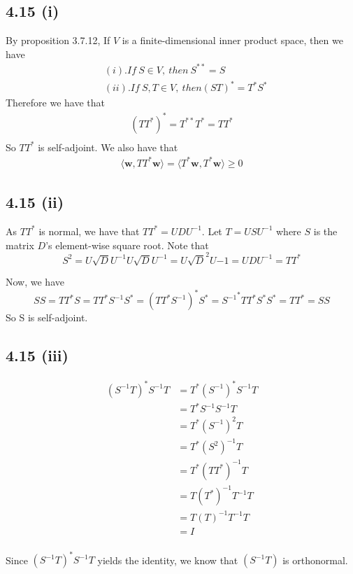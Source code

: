 \documentclass[letterpaper,12pt]{article}
\theoremstyle{definition}
\begin{document}
\subsection*{4.15 (i)}
By proposition 3.7.12, If $V$ is a finite-dimensional inner product space, then we have
\begin{align*}
&(i). If ~S \in V,~ then~ S^{**} = S\\
&(ii). If ~S,T \in V, ~then (ST)^* = T^*S^*
\end{align*}
Therefore we have that 
\begin{align*}
(TT^*)^* = T^{**}T^* = TT^* \\
\end{align*}
So $TT^*$ is self-adjoint. We also have that
\begin{align*}
\langle \mathbf{w}, TT^* \mathbf{w} \rangle = \langle T^* \mathbf{w}, T^* \mathbf{w} \rangle \geq 0
\end{align*}


\subsection*{4.15 (ii)}
As $TT^*$ is normal, we have that $TT^* = UDU^{-1}$. Let $T = USU^{-1}$ where $S$ is the matrix $D$'s element-wise square root. Note that
\[ S^2 = U\sqrt{D}U^{-1}U\sqrt{D}U^{-1} = U\sqrt{D}^2U{-1} = UDU^{-1} = TT^*\]
    
Now, we have
\[SS = TT^*
S = TT^*S^{-1}
S^* = (TT^*S^{-1})^*
S^* = {S^{-1}}^*TT^*
S^*S^* = TT^* = SS
\]
So S is self-adjoint.

\subsection*{4.15 (iii)}

\begin{align*} 
(S^{-1}T)^*S^{-1}T &= T^*(S^{-1})^*S^{-1}T\\
&= T^*S^{-1}S^{-1}T\\
&= T^*(S^{-1})^{2}T\\
&= T^*(S^2)^{-1}T\\
&= T^*(TT^*)^{-1}T\\
&= T(T^*)^{-1}T^{-1}T\\
&= T(T)^{-1}T^{-1}T\\
&= I\\
\end{align*}

Since $(S^{-1}T)^*S^{-1}T$ yields the identity, we know that $(S^{-1}T)$ is orthonormal.\\
\end{document}
